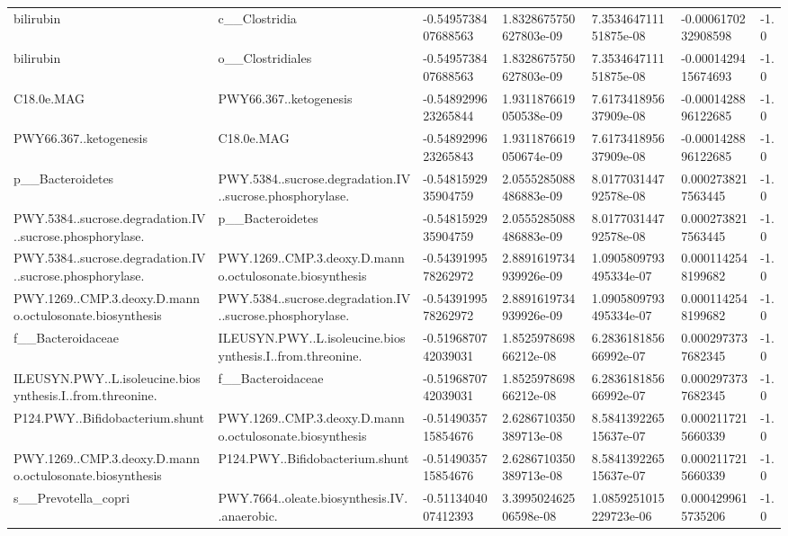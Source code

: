 \begin{longtable}{lllllll}
bilirubin & c\_\_Clostridia & -0.5495738407688563 & 1.8328675750627803e-09 & 7.353464711151875e-08 & -0.0006170232908598 & -1.0 \\
bilirubin & o\_\_Clostridiales & -0.5495738407688563 & 1.8328675750627803e-09 & 7.353464711151875e-08 & -0.0001429415674693 & -1.0 \\
C18.0e.MAG & PWY66.367..ketogenesis & -0.5489299623265844 & 1.9311876619050538e-09 & 7.617341895637909e-08 & -0.0001428896122685 & -1.0 \\
PWY66.367..ketogenesis & C18.0e.MAG & -0.5489299623265843 & 1.9311876619050674e-09 & 7.617341895637909e-08 & -0.0001428896122685 & -1.0 \\
p\_\_Bacteroidetes & PWY.5384..sucrose.degradation.IV..sucrose.phosphorylase. & -0.5481592935904759 & 2.0555285088486883e-09 & 8.017703144792578e-08 & 0.0002738217563445 & -1.0 \\
PWY.5384..sucrose.degradation.IV..sucrose.phosphorylase. & p\_\_Bacteroidetes & -0.5481592935904759 & 2.0555285088486883e-09 & 8.017703144792578e-08 & 0.0002738217563445 & -1.0 \\
PWY.5384..sucrose.degradation.IV..sucrose.phosphorylase. & PWY.1269..CMP.3.deoxy.D.manno.octulosonate.biosynthesis & -0.5439199578262972 & 2.8891619734939926e-09 & 1.0905809793495334e-07 & 0.0001142548199682 & -1.0 \\
PWY.1269..CMP.3.deoxy.D.manno.octulosonate.biosynthesis & PWY.5384..sucrose.degradation.IV..sucrose.phosphorylase. & -0.5439199578262972 & 2.8891619734939926e-09 & 1.0905809793495334e-07 & 0.0001142548199682 & -1.0 \\
f\_\_Bacteroidaceae & ILEUSYN.PWY..L.isoleucine.biosynthesis.I..from.threonine. & -0.5196870742039031 & 1.852597869866212e-08 & 6.283618185666992e-07 & 0.0002973737682345 & -1.0 \\
ILEUSYN.PWY..L.isoleucine.biosynthesis.I..from.threonine. & f\_\_Bacteroidaceae & -0.5196870742039031 & 1.852597869866212e-08 & 6.283618185666992e-07 & 0.0002973737682345 & -1.0 \\
P124.PWY..Bifidobacterium.shunt & PWY.1269..CMP.3.deoxy.D.manno.octulosonate.biosynthesis & -0.5149035715854676 & 2.6286710350389713e-08 & 8.584139226515637e-07 & 0.0002117215660339 & -1.0 \\
PWY.1269..CMP.3.deoxy.D.manno.octulosonate.biosynthesis & P124.PWY..Bifidobacterium.shunt & -0.5149035715854676 & 2.6286710350389713e-08 & 8.584139226515637e-07 & 0.0002117215660339 & -1.0 \\
s\_\_Prevotella\_copri & PWY.7664..oleate.biosynthesis.IV..anaerobic. & -0.5113404007412393 & 3.399502462506598e-08 & 1.0859251015229723e-06 & 0.0004299615735206 & -1.0 \\

\end{longtable}
